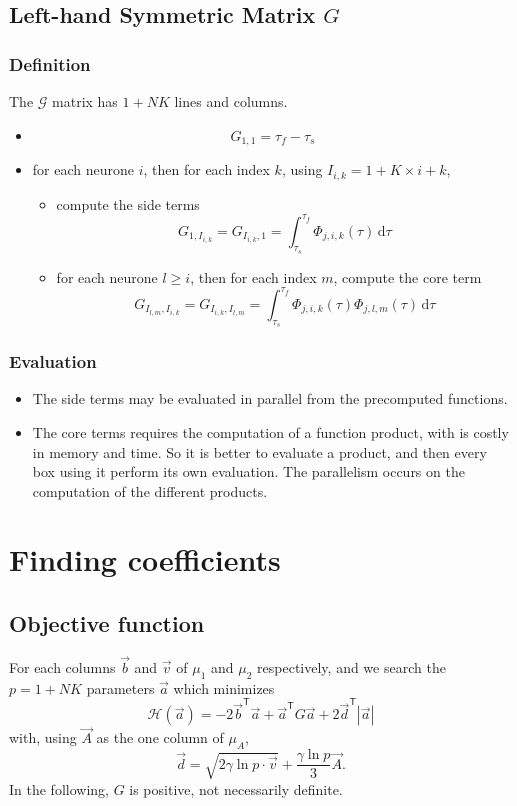\documentclass{revtex4}
\newcommand{\abs}[1]{\left|#1\right|}
\newcommand{\trn}[1]{{#1}^{\mathsf{T}}}
\begin{document}
\subsection{Left-hand Symmetric Matrix ${G}$}
\subsubsection{Definition}
The $\mathcal{G}$ matrix has $1+NK$ lines and columns.
\begin{itemize}
	\item 
		$$ 
		{G}_{1,1} = \tau_f-\tau_s
		$$
	\item for each neurone $i$, then for each index $k$, using $I_{i,k}=1+K\times i + k$,
		\begin{itemize}
		\item compute the side terms
		$$
			{G}_{1,I_{i,k}} = {G}_{I_{i,k},1} = \int_{\tau_s}^{\tau_f} \Phi_{j,i,k}(\tau) \, \mathrm{d}\tau
		$$
		\item for each neurone $l\geq i$, then for each index $m$, compute the core term
		$$
			{G}_{I_{l,m},I_{i,k}} = {G}_{I_{i,k},I_{l,m}}  =
			\int_{\tau_s}^{\tau_f}  \Phi_{j,i,k}(\tau) \Phi_{j,l,m}(\tau) \, \mathrm{d}\tau
		$$
		\end{itemize}
\end{itemize}

\subsubsection{Evaluation}
\begin{itemize}
\item The side terms may be evaluated in parallel from the precomputed functions.

\item The core terms requires the computation of a function product, with is costly
in memory and time. So it is better to evaluate a product, and then 
every box using it perform its own evaluation.
 The parallelism occurs
on the computation of the different products.
\end{itemize}

\section{Finding coefficients}
\subsection{Objective function}
For each columns $\vec{b}$ and $\vec{v}$ of $\mu_1$ and $\mu_2$ respectively, and we search the $p=1+NK$ parameters $\vec{a}$ which minimizes
\begin{equation}
	\mathcal{H}\left(\vec{a}\right) = -2\trn{\vec{b}}\vec{a} + \trn{\vec{a}} G \vec{a} +2 \trn{\vec{d}} \abs{\vec{a}}
\end{equation}
with, using $\vec{A}$ as the one column of $\mu_A$, 
\begin{equation}
	\vec{d} = \sqrt{2\gamma \ln p \cdot \vec{v}} + \dfrac{\gamma\ln p}{3} \vec{A}. 
\end{equation}
In the following, $G$ is positive, not necessarily definite.
\end{document}
